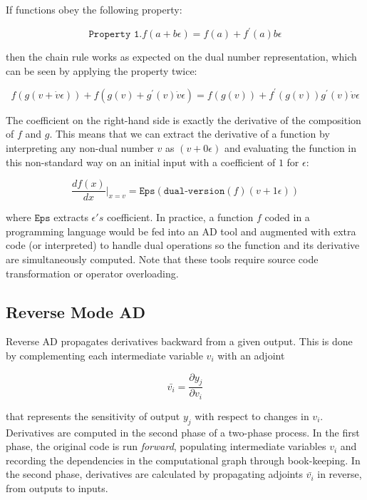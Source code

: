 \documentclass[11pt]{article}
\theoremstyle{definition}
\theoremstyle{plain}
\begin{document}
\noindent If functions obey the following property:

$$ \texttt{Property 1.} f(a + b \epsilon) = f(a) + f^\prime(a) b \epsilon$$

\noindent then the chain rule works as expected on the dual number representation, which
can be seen by applying the property twice:

$$ f(g(v + \dot{v}\epsilon)) + f(g(v) + g^\prime(v) \dot{v} \epsilon) =
f(g(v)) + f^\prime(g(v))g^\prime(v) \dot{v} \epsilon $$

\noindent The coefficient on the right-hand side is exactly the derivative of the
composition of $f$ and $g$. 
This means that we can extract the derivative of a function by interpreting
any non-dual number $v$ as $(v + 0 \epsilon)$ and evaluating the function
in this non-standard way on an initial input with a coefficient of $1$ for $\epsilon$:

$$ \frac{d f(x)}{dx} \rvert_{x=v} = \texttt{Eps}(\texttt{dual-version}(f)(v+1\epsilon)) $$

\noindent where $\texttt{Eps}$ extracts $\epsilon's$ coefficient.
In practice, a function $f$ coded in a programming language would be fed
into an AD tool and augmented with extra code (or interpreted) to handle
dual operations so the function and its derivative are simultaneously computed.
Note that these tools require source code transformation or operator overloading.

\newpage

\subsection{Reverse Mode AD}

\noindent Reverse AD propagates derivatives backward from a given output. This
is done by complementing each intermediate variable $v_i$ with an adjoint

$$ \bar{v_i} = \frac{\partial y_j}{\partial v_i} $$

\noindent that represents the sensitivity of output $y_j$ with respect
to changes in $v_i$. Derivatives are computed in the second phase of a two-phase process.
In the first phase, the original code is run \textit{forward}, populating intermediate
variables $v_i$ and recording the dependencies in the computational graph through
book-keeping. In the second phase, derivatives are calculated by propagating adjoints
$\bar{v_i}$ in reverse, from outputs to inputs.\\
\end{document}
